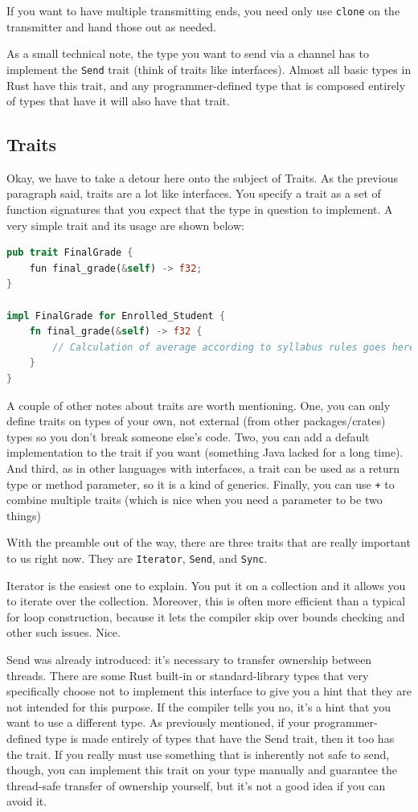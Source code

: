 \documentclass[a4paper]{report}
\begin{document}
If you want to have multiple transmitting ends, you need only use \texttt{clone} on the transmitter and hand those out as needed. 

As a small technical note, the type you want to send via a channel has to implement the \texttt{Send} trait (think of traits like interfaces). Almost all basic types in Rust have this trait, and any programmer-defined type that is composed entirely of types that have it will also have that trait.  


\subsection*{Traits}
Okay, we have to take a detour here onto the subject of Traits. As the previous paragraph said, traits are a lot like interfaces. You specify a trait as a set of function signatures that you expect that the type in question to implement. A very simple trait and its usage are shown below:

\begin{lstlisting}[language=Rust]
pub trait FinalGrade {
	fun final_grade(&self) -> f32;
}

impl FinalGrade for Enrolled_Student {
    fn final_grade(&self) -> f32 {
        // Calculation of average according to syllabus rules goes here
    }	
}  
\end{lstlisting}

A couple of other notes about traits are worth mentioning. One, you can only define traits on types of your own, not external (from other packages/crates) types so you don't break someone else's code. Two, you can add a default implementation to the trait if you want (something Java lacked for a long time). And third, as in other languages with interfaces, a trait can be used as a return type or method parameter, so it is a kind of generics. Finally, you can use \texttt{+} to combine multiple traits (which is nice when you need a parameter to be two things)

With the preamble out of the way, there are three traits that are really important to us right now. They are \texttt{Iterator}, \texttt{Send}, and \texttt{Sync}. 

Iterator is the easiest one to explain. You put it on a collection and it allows you to iterate over the collection. Moreover, this is often more efficient than a typical for loop construction, because it lets the compiler skip over bounds checking and other such issues. Nice.

Send was already introduced: it's necessary to transfer ownership between threads. There are some Rust built-in or standard-library types that very specifically choose not to implement this interface to give you a hint that they are not intended for this purpose. If the compiler tells you no, it's a hint that you want to use a different type. As previously mentioned, if your programmer-defined type is made entirely of types that have the Send trait, then it too has the trait. If you really must use something that is inherently not safe to send, though, you can implement this trait on your type manually and guarantee the thread-safe transfer of ownership yourself, but it's not a good idea if you can avoid it.
\end{document}
